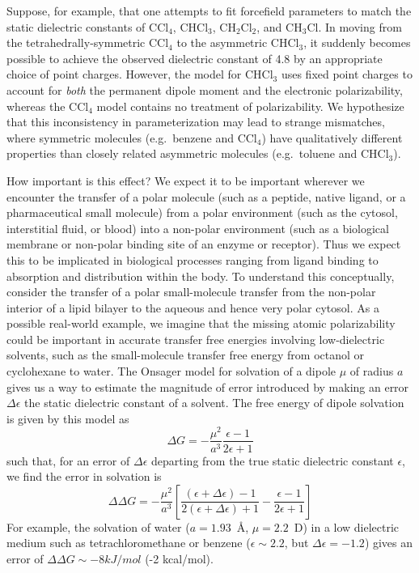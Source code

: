 \documentclass[aps,pre,twocolumn,nofootinbib,superscriptaddress,linenumbers]{revtex4-1}
\begin{document}
Suppose, for example, that one attempts to fit forcefield parameters to match the static dielectric constants of $\mathrm{CCl_4}$, $\mathrm{CHCl_3}$, $\mathrm{CH_2Cl_2}$, and $\mathrm{CH_3Cl}$.
In moving from the tetrahedrally-symmetric $\mathrm{CCl_4}$ to the asymmetric $\mathrm{CHCl_3}$, it suddenly becomes possible to achieve the observed dielectric constant of 4.8 by an appropriate choice of point charges.
However, the model for $\mathrm{CHCl_3}$ uses fixed point charges to account for \emph{both} the permanent dipole moment and the electronic polarizability, whereas the $\mathrm{CCl_4}$ model contains no treatment of polarizability.  
We hypothesize that this inconsistency in parameterization may lead to strange mismatches, where symmetric molecules (e.g.~benzene and $\mathrm{CCl_4}$) have qualitatively different properties than closely related asymmetric molecules (e.g.~toluene and $\mathrm{CHCl_3}$).

How important is this effect?
We expect it to be important wherever we encounter the transfer of a polar molecule (such as a peptide, native ligand, or a pharmaceutical small molecule) from a polar environment (such as the cytosol, interstitial fluid, or blood) into a non-polar environment (such as a biological membrane or non-polar binding site of an enzyme or receptor). Thus we expect this to be implicated in biological processes ranging from ligand binding to absorption and distribution within the body. To understand this conceptually, consider the transfer of a polar small-molecule transfer from the non-polar interior of a lipid bilayer to the aqueous and hence very polar cytosol.
As a possible real-world example, we imagine that the missing atomic polarizability could be important in accurate transfer free energies involving low-dielectric solvents, such as the small-molecule transfer free energy from octanol or cyclohexane to water.  
The Onsager model for solvation of a dipole $\mu$ of radius $a$ gives us a way to estimate the magnitude of error introduced by making an error $\Delta \epsilon$ the static dielectric constant of a solvent.
The free energy of dipole solvation is given by this model as
\begin{equation} \label{eq:onsager}
\Delta G = -\frac{\mu^2}{a^3}\frac{\epsilon - 1}{2 \epsilon + 1}
\end{equation}
such that, for an error of $\Delta \epsilon$ departing from the true static dielectric constant $\epsilon$, we find the error in solvation is
\begin{equation} \label{equation:onsager-error}
\Delta \Delta G = -\frac{\mu^2}{a^3} \left[ \frac{(\epsilon+\Delta \epsilon) - 1}{2 (\epsilon+\Delta \epsilon) + 1} - \frac{\epsilon - 1}{2 \epsilon + 1} \right] 
\end{equation}
For example, the solvation of water ($a = 1.93$~\AA, $\mu = 2.2$~D) in a low dielectric medium such as tetrachloromethane or benzene ($\epsilon \sim 2.2$, but $\Delta \epsilon = -1.2$) gives an error of $\Delta \Delta G \sim -8 kJ/mol$ (-2 kcal/mol).
\end{document}
